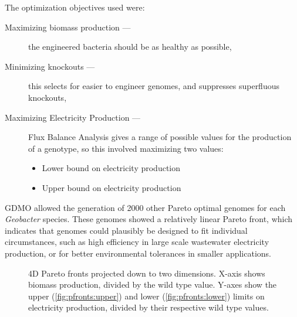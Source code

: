 \documentclass[a4paper,11pt]{article}
\begin{document}
The optimization objectives used were:
\begin{description}
	\item[Maximizing biomass production ---] the engineered bacteria should be as healthy as possible,
	\item[Minimizing knockouts ---] this selects for easier to engineer genomes, and suppresses superfluous knockouts,
	\item[Maximizing Electricity Production ---] Flux Balance Analysis gives a range of possible values for the production of a genotype, so this involved maximizing two values:
	\begin{itemize}
		\item Lower bound on electricity production
		\item Upper bound on electricity production
	\end{itemize}
\end{description}

GDMO allowed the generation of 2000 other Pareto optimal genomes for each {\it Geobacter} species. These genomes showed a relatively linear Pareto front, which indicates that genomes could plausibly be designed to fit individual circumstances, such as high efficiency in large scale wastewater electricity production, or for better environmental tolerances in smaller applications.

\begin{figure}[!htb]
	\caption{4D Pareto fronts projected down to two dimensions. X-axis shows biomass production, divided by the wild type value. Y-axes show the upper (\ref{fig:pfronts:upper}) and lower (\ref{fig:pfronts:lower}) limits on electricity production, divided by their respective wild type values. \label{fig:pfronts}}
\end{figure}
\end{document}
